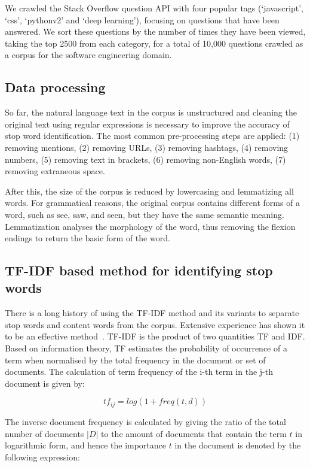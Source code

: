 \documentclass[conference]{IEEEtran}
\begin{document}
\begin{sloppy}
We crawled the Stack Overflow question API with four popular tags (`javascript', `css', `pythonv2' and `deep learning'), focusing on questions that have been answered. We sort these questions by the number of times they have been viewed, taking the top 2500 from each category, for a total of 10,000 questions crawled as a corpus for the software engineering domain. 

\subsection{Data processing}

So far, the natural language text in the corpus is unstructured and cleaning the original text using regular expressions is necessary to improve the accuracy of stop word identification. The most common pre-processing steps are applied: (1) removing mentions, (2) removing URLs, (3) removing hashtags, (4) removing numbers, (5) removing text in brackets, (6) removing non-English words, (7) removing extraneous space. 
 
After this, the size of the corpus is reduced by lowercasing and lemmatizing all words. For grammatical reasons, the original corpus contains different forms of a word, such as see, saw, and seen, but they have the same semantic meaning. Lemmatization analyses the morphology of the word, thus removing the flexion endings to return the basic form of the word. 

\subsection{TF-IDF based method for identifying stop words}

There is a long history of using the TF-IDF method and its variants to separate stop words and content words from the corpus. Extensive experience has shown it to be an effective method~\cite{fox1989stop, aizawa2000feature, konchady2006text}. TF-IDF is the product of two quantities TF and IDF. Based on information theory, TF estimates the probability of occurrence of a term when normalised by the total frequency in the document or set of documents. The calculation of term frequency of the i-th term in the j-th document is given by: 

\begin{equation}
tf_{ij}=log(1+freq(t,d))
\end{equation}

The inverse document frequency is calculated by giving the ratio of the total number of documents $|D|$ to the amount of documents that contain the term $t$ in logarithmic form, and hence the importance $t$ in the document is denoted by the following expression: 


\end{sloppy}
\end{document}
